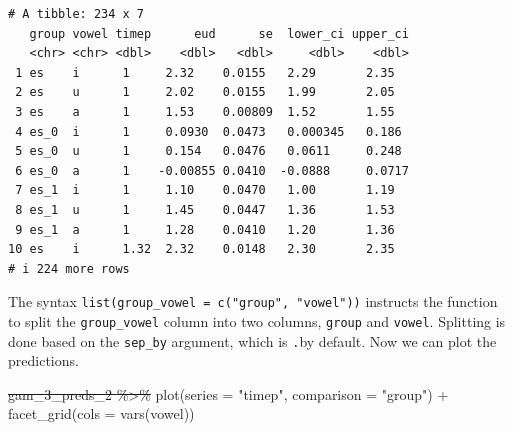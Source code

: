 \documentclass[
  letterpaper,
  DIV=11,
  numbers=noendperiod]{scrartcl}
\newenvironment{Shaded}{\begin{snugshade}}{\end{snugshade}}
\newcommand{\AttributeTok}[1]{\textcolor[rgb]{0.40,0.45,0.13}{#1}}
\newcommand{\CommentTok}[1]{\textcolor[rgb]{0.37,0.37,0.37}{#1}}
\newcommand{\FunctionTok}[1]{\textcolor[rgb]{0.28,0.35,0.67}{#1}}
\newcommand{\NormalTok}[1]{\textcolor[rgb]{0.00,0.23,0.31}{#1}}
\newcommand{\SpecialCharTok}[1]{\textcolor[rgb]{0.37,0.37,0.37}{#1}}
\newcommand{\StringTok}[1]{\textcolor[rgb]{0.13,0.47,0.30}{#1}}
\providecommand{\DIFadd}[1]{{\protect\color{blue}\uwave{#1}}} %
\providecommand{\DIFdel}[1]{{\protect\color{red}\sout{#1}}}                      %
\providecommand{\DIFaddbegin}{} %
\providecommand{\DIFaddend}{} %
\providecommand{\DIFdelbegin}{} %
\providecommand{\DIFdelend}{} %
\newcommand{\DIFscaledelfig}{0.5}
\newlength{\DIFdelgraphicswidth} %
\newlength{\DIFdelgraphicsheight} %
\newcommand{\DIFaddincludegraphics}[2][]{{\color{blue}\fbox{\DIFOincludegraphics[#1]{#2}}}} %
\newcommand{\DIFdelincludegraphics}[2][]{%
\sbox{\DIFdelgraphicsbox}{\DIFOincludegraphics[#1]{#2}}%
\settoboxwidth{\DIFdelgraphicswidth}{\DIFdelgraphicsbox} %
\settoboxtotalheight{\DIFdelgraphicsheight}{\DIFdelgraphicsbox} %
\scalebox{\DIFscaledelfig}{%
\parbox[b]{\DIFdelgraphicswidth}{\usebox{\DIFdelgraphicsbox}\\[-\baselineskip] \rule{\DIFdelgraphicswidth}{0em}}\llap{\resizebox{\DIFdelgraphicswidth}{\DIFdelgraphicsheight}{%
\setlength{\unitlength}{\DIFdelgraphicswidth}%
\begin{picture}(1,1)%
\thicklines\linethickness{2pt} %
{\color[rgb]{1,0,0}\put(0,0){\framebox(1,1){}}}%
{\color[rgb]{1,0,0}\put(0,0){\line( 1,1){1}}}%
{\color[rgb]{1,0,0}\put(0,1){\line(1,-1){1}}}%
\end{picture}%
}\hspace*{3pt}}} %
} %
\DeclareRobustCommand{\DIFaddbegin}{\DIFOaddbegin \let\includegraphics\DIFaddincludegraphics} %
\DeclareRobustCommand{\DIFaddend}{\DIFOaddend \let\includegraphics\DIFOincludegraphics} %
\DeclareRobustCommand{\DIFdelbegin}{\DIFOdelbegin \let\includegraphics\DIFdelincludegraphics} %
\DeclareRobustCommand{\DIFdelend}{\DIFOaddend \let\includegraphics\DIFOincludegraphics} %
\begin{document}
\begin{verbatim}
# A tibble: 234 x 7
   group vowel timep      eud      se  lower_ci upper_ci
   <chr> <chr> <dbl>    <dbl>   <dbl>     <dbl>    <dbl>
 1 es    i      1     2.32    0.0155   2.29       2.35
 2 es    u      1     2.02    0.0155   1.99       2.05
 3 es    a      1     1.53    0.00809  1.52       1.55
 4 es_0  i      1     0.0930  0.0473   0.000345   0.186
 5 es_0  u      1     0.154   0.0476   0.0611     0.248
 6 es_0  a      1    -0.00855 0.0410  -0.0888     0.0717
 7 es_1  i      1     1.10    0.0470   1.00       1.19
 8 es_1  u      1     1.45    0.0447   1.36       1.53
 9 es_1  a      1     1.28    0.0410   1.20       1.36
10 es    i      1.32  2.32    0.0148   2.30       2.35
# i 224 more rows
\end{verbatim}

The syntax \texttt{list(group\_vowel\ =\ c("group",\ "vowel"))}
instructs the function to split the \texttt{group\_vowel} column into
two columns, \texttt{group} and \texttt{vowel}. Splitting is done based
on the \texttt{sep\_by} argument, which is \DIFaddbegin \DIFadd{a period (}\DIFaddend \texttt{.}\DIFaddbegin \DIFadd{) }\DIFaddend by
default. Now we can plot the predictions.

\begin{Shaded}
\begin{Highlighting}[]
\DIFdelbegin \DIFdel{\NormalTok{gam\_3\_preds\_2 }\SpecialCharTok{\%\textgreater{}\%}
  }\DIFdelend \DIFaddbegin \DIFadd{\CommentTok{\# Plot predictions}
\NormalTok{gam\_3\_preds\_2 }\SpecialCharTok{|\textgreater{}}
  }\DIFaddend \FunctionTok{plot}\NormalTok{(}\AttributeTok{series =} \StringTok{"timep"}\NormalTok{, }\AttributeTok{comparison =} \StringTok{"group"}\NormalTok{) }\SpecialCharTok{+}
  \FunctionTok{facet\_grid}\NormalTok{(}\AttributeTok{cols =} \FunctionTok{vars}\NormalTok{(vowel))}
\end{Highlighting}
\end{Shaded}
\end{document}
